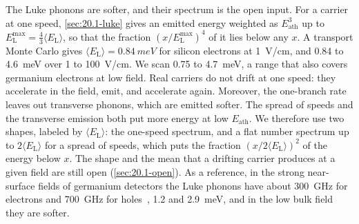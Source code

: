 The Luke phonons are softer, and their spectrum is the open input. For a carrier at one speed, \cref{sec:20.1-luke} gives an emitted energy weighted as $E_{\mathrm{ath}}^3$ up to $E_{\mathrm{L}}^{\max} = \frac43\langle E_{\mathrm{L}}\rangle$, so that the fraction $(x/E_{\mathrm{L}}^{\max})^4$ of it lies below any $x$. A transport Monte Carlo gives $\langle E_{\mathrm{L}}\rangle = \SI{0.84}{meV}$ for silicon electrons at \SI{1}{V/cm}, and 0.84 to \SI{4.6}{meV} over 1 to \SI{100}{V/cm}. We scan 0.75 to \SI{4.7}{meV}, a range that also covers germanium electrons at low field. Real carriers do not drift at one speed: they accelerate in the field, emit, and accelerate again. Moreover, the one-branch rate leaves out transverse phonons, which are emitted softer. The spread of speeds and the transverse emission both put more energy at low $E_{\mathrm{ath}}$. We therefore use two shapes, labeled by $\langle E_{\mathrm{L}}\rangle$: the one-speed spectrum, and a flat number spectrum up to $2\langle E_{\mathrm{L}}\rangle$ for a spread of speeds, which puts the fraction $(x/2\langle E_{\mathrm{L}}\rangle)^2$ of the energy below $x$. The shape and the mean that a drifting carrier produces at a given field are still open (\cref{sec:20.1-open}). As a reference, in the strong near-surface fields of germanium detectors the Luke phonons have about \SI{300}{GHz} for electrons and \SI{700}{GHz} for holes~\cite[Sect.~1]{hertel2012phonon}, 1.2 and \SI{2.9}{meV}, and in the low bulk field they are softer.


